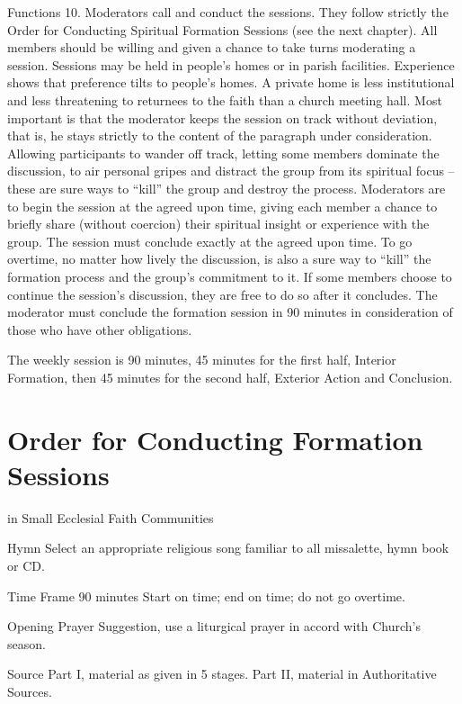 \documentclass[oneside]{book}
\begin{document}
Functions
10. Moderators call and conduct the sessions. They follow strictly the Order for
Conducting Spiritual Formation Sessions (see the next chapter). All members
should be willing and given a chance to take turns moderating a
session. Sessions may be held in people's homes or in parish
facilities. Experience shows that preference tilts to people's homes. A private
home is less institutional and less threatening to returnees to the faith than a
church meeting hall.
Most important is that the moderator keeps the session on track without
deviation, that is, he stays strictly to the content of the paragraph under
consideration. Allowing participants to wander off track, letting some members
dominate the discussion, to air personal gripes and distract the group from its
spiritual focus -- these are sure ways to ``kill'' the group and destroy the
process.
Moderators are to begin the session at the agreed upon time, giving each member
a chance to briefly share (without coercion) their spiritual insight or
experience with the group. The session must conclude exactly at the agreed upon
time. To go overtime, no matter how lively the discussion, is also a sure way to
``kill'' the formation process and the group's commitment to it.
If some members choose to continue the session's discussion, they are free to do
so after it concludes. The moderator must conclude the formation session in 90
minutes in consideration of those who have other obligations.

The weekly session is 90 minutes, 45 minutes for the first half, Interior
Formation, then 45 minutes for the second half, Exterior Action and Conclusion.


\chapter{Order for Conducting Formation Sessions}

in Small Ecclesial Faith Communities

Hymn
Select an appropriate religious song familiar to all  missalette, hymn book or
CD.

Time Frame
90 minutes
Start on time; end on time; do not go overtime.

Opening Prayer
Suggestion, use a liturgical prayer in accord with Church's season.

Source
Part I, material as given in 5 stages.
Part II, material in Authoritative Sources.
\end{document}
